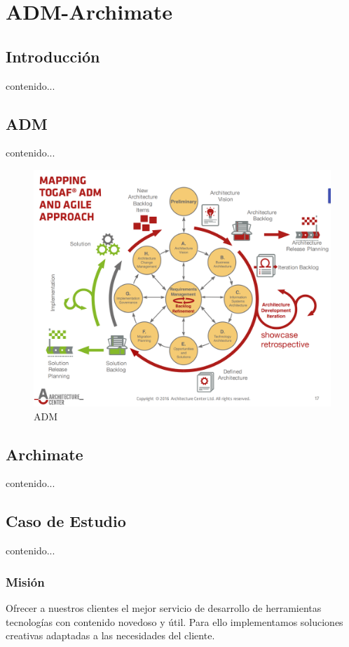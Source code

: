 \chapter{ADM-Archimate}
\section{Introducción}
contenido...
\newpage

\section{ADM}
contenido...

\begin{figure}[h!]
	\centering
	\includegraphics[width=0.7\linewidth]{ARQUITECTURA/imgs/adm}
	\caption{ADM \cite{SB,1579133,6337726,6337730,6827125}}
\end{figure}


\newpage

\section{Archimate}
contenido...

\newpage

\section{Caso de Estudio}
contenido...

\subsection{Misión}
Ofrecer a nuestros clientes el mejor servicio de desarrollo de herramientas tecnologías con contenido novedoso y útil. Para ello implementamos soluciones creativas adaptadas a las necesidades del cliente.
